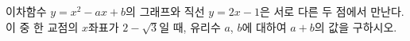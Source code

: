 이차함수 $y=x^2-ax+b$의 그래프와 직선 $y=2x-1$은 서로 다른 두 점에서 만난다. 이 중 한 교점의 $x$좌표가 $2-\sqrt{3}$일 때, 유리수 $a$, $b$에 대하여 $a+b$의 값을 구하시오.

